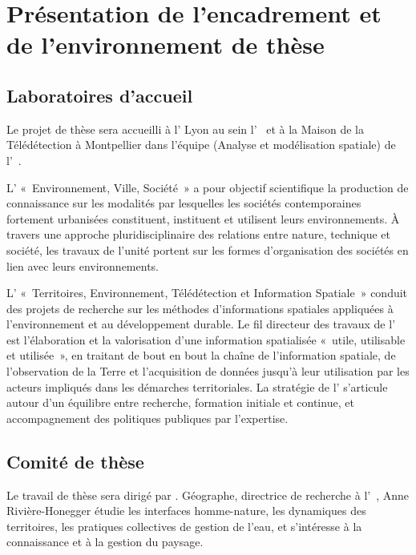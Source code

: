 \section[environnement]
{Présentation de l'encadrement et de l'environnement de thèse}

\subsection{Laboratoires d'accueil}

Le projet de thèse sera accueilli à l'{\ENS} Lyon au sein l'{\UMR\ \EVS} et à la Maison de la Télédétection
à Montpellier dans l'équipe {\AMoS} (Analyse et modélisation spatiale) de l'{\UMR\ \TETIS}.

L'{\UMR} « Environnement, Ville, Société » a pour objectif scientifique
la production de connaissance sur les modalités
par lesquelles les sociétés contemporaines fortement urbanisées
constituent, instituent et utilisent leurs environnements.
À travers une approche pluridisciplinaire des relations entre nature,
technique et société, les travaux de l'unité
portent sur les formes d'organisation des sociétés en lien avec leurs environnements.

L'{\UMR} « Territoires, Environnement, Télédétection et Information Spatiale »
conduit des projets de recherche
sur les méthodes d'informations spatiales appliquées à l'environnement et
au développement durable.
Le fil directeur des travaux de l'{\UMR} est l'élaboration et la valorisation
d'une information spatialisée « utile, utilisable et utilisée »,
en traitant de bout en bout la chaîne de l'information spatiale,
de l'observation de la Terre et
l'acquisition de données jusqu'à leur utilisation par les acteurs impliqués
dans les démarches territoriales.
La stratégie de l'{\UMR} s'articule autour d'un équilibre entre recherche,
formation initiale et continue,
et accompagnement des politiques publiques par l'expertise.


\subsection{Comité de thèse}

Le travail de thèse sera dirigé par . Géographe, directrice de recherche {\CNRS} à l'{\UMR\ \EVS},
Anne Rivière-Honegger étudie les interfaces homme-nature, les dynamiques des territoires,
les pratiques collectives de gestion de l'eau, et s'intéresse à la connaissance et à la gestion du paysage.

